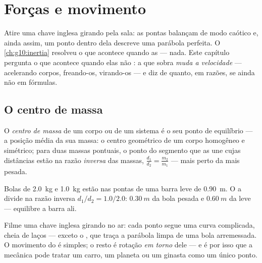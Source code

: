 \chapter{Forças e movimento}\label{ch:g11:forces-and-motion}

Atire uma chave inglesa girando pela sala: as pontas balançam de modo
caótico e, ainda assim, um ponto dentro dela descreve uma parábola
perfeita. O \cref{ch:g10:inertia} resolveu o que acontece quando as
  --- nada. Este capítulo pergunta o que acontece
quando elas não : a  que sobra \emph{muda a velocidade}
--- acelerando corpos, freando-os, virando-os --- e diz de quanto, em
razões, se ainda não em fórmulas.

\section{O centro de massa}

\begin{definition}\label{def:g11:forces-and-motion:com}
O \emph{centro de massa} de um corpo ou de um
sistema é o seu ponto de equilíbrio --- a posição média da sua massa: o
centro geométrico de um corpo homogêneo e simétrico; para duas massas
pontuais, o ponto do segmento que as une cujas distâncias estão na razão
\emph{inversa} das massas, $\frac{d_1}{d_2} = \frac{m_2}{m_1}$ --- mais
perto da mais pesada.
\end{definition}

\begin{example}\label{ex:g11:forces-and-motion:dumbbell}
Bolas de \qty{2.0}{kg} e \qty{1.0}{kg} estão nas pontas de uma barra leve
de \qty{0.90}{m}. O  a divide na razão inversa
$d_1/d_2 = 1.0/2.0$: $\qty{0.30}{m}$ da bola pesada e $\qty{0.60}{m}$ da
leve --- equilibre a barra ali.
\end{example}

\begin{remark}\label{rem:g11:forces-and-motion:wrench}
Filme uma chave inglesa girando no ar: cada ponto segue uma curva
complicada, cheia de laços --- exceto o , que traça a
parábola limpa de uma bola arremessada. O movimento do  é
simples; o resto é rotação \emph{em torno} dele --- e é por isso que a
mecânica pode tratar um carro, um planeta ou um ginasta como um único
ponto.
\end{remark}

